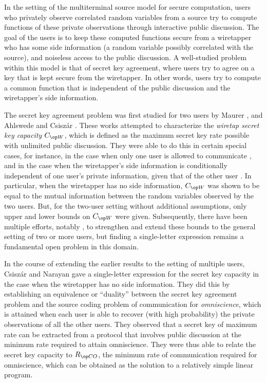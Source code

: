 In the setting of the multiterminal source model for secure computation, users who privately observe correlated random variables from a source try to compute functions of these private observations through interactive public discussion. The goal of the users is to keep these computed functions secure from a wiretapper who has some side information (a random variable possibly correlated with the source), and noiseless access to the public discussion. A well-studied problem within this model is that of secret key agreement, where users try to agree on a key that is kept secure from the wiretapper. In other words, users try to compute a common function that is independent of the public discussion and the wiretapper's side information. 

The secret key agreement problem was first studied for two users by Maurer \cite{maurer93}, and Ahlswede and Csisz\'ar \cite{ahlswedeCRpart1}. These works attempted to characterize the \emph{wiretap secret key capacity} $\wskc$, which is defined as the maximum secret key rate possible with unlimited public discussion. They were able to do this in certain special cases, for instance, in the case when only one user is allowed to communicate \cite[Theorem~1]{ahlswedeCRpart1}, and in the case when the wiretapper's side information is conditionally independent of one user's private information, given that of the other user \cite[Theorems~2 and 3]{maurer93}. In particular, when the wiretapper has no side information, $\wskc$ was shown to be equal to the mutual information between the random variables observed by the two users. But, for the two-user setting without additional assumptions, only upper and lower bounds on $\wskc$ were given. Subsequently, there have been multiple efforts, notably \cite{renner_wolf03,csiszar04,aminsource}, to strengthen and extend these bounds to the general setting of two or more users, but finding a single-letter expression remains a fundamental open problem in this domain.

In the course of extending the earlier results to the setting of multiple users, Csisz{\'a}r and Narayan \cite{csiszar04} gave a single-letter expression for the secret key capacity in the case when the wiretapper has no side information. They did this by establishing an equivalence or ``duality'' between the secret key agreement problem and the source coding problem of communication for \emph{omniscience}, which is attained when each user is able to recover (with high probability) the private observations of all the other users. They observed that a secret key of maximum rate can be extracted from a protocol that involves public discussion at the minimum rate required to attain omniscience. They were thus able to relate the secret key capacity to $\rco$, the minimum rate of communication required for omniscience, which can be obtained as the solution to a relatively simple linear program. 

